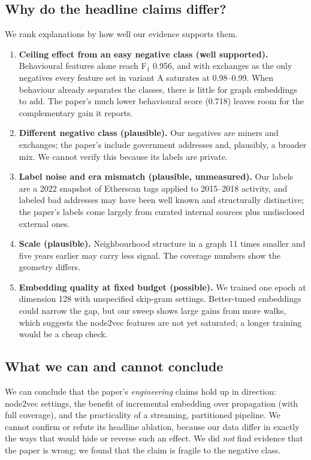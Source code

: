 \subsection{Why do the headline claims differ?}
We rank explanations by how well our evidence supports them.
\begin{enumerate}
\item \textbf{Ceiling effect from an easy negative class (well supported).} Behavioural features alone reach F$_1$ 0.956, and with exchanges as the only negatives every feature set in variant A saturates at 0.98--0.99. When behaviour already separates the classes, there is little for graph embeddings to add. The paper's much lower behavioural score (0.718) leaves room for the complementary gain it reports.
\item \textbf{Different negative class (plausible).} Our negatives are miners and exchanges; the paper's include government addresses and, plausibly, a broader mix. We cannot verify this because its labels are private.
\item \textbf{Label noise and era mismatch (plausible, unmeasured).} Our labels are a 2022 snapshot of Etherscan tags applied to 2015--2018 activity, and labeled bad addresses may have been well known and structurally distinctive; the paper's labels come largely from curated internal sources plus undisclosed external ones.
\item \textbf{Scale (plausible).} Neighbourhood structure in a graph 11 times smaller and five years earlier may carry less signal. The coverage numbers show the geometry differs.
\item \textbf{Embedding quality at fixed budget (possible).} We trained one epoch at dimension 128 with unspecified skip-gram settings. Better-tuned embeddings could narrow the gap, but our sweep shows large gains from more walks, which suggests the node2vec features are not yet saturated; a longer training would be a cheap check.
\end{enumerate}

\subsection{What we can and cannot conclude}
We can conclude that the paper's \emph{engineering} claims hold up in direction: node2vec settings, the benefit of incremental embedding over propagation (with full coverage), and the practicality of a streaming, partitioned pipeline. We cannot confirm or refute its headline ablation, because our data differ in exactly the ways that would hide or reverse such an effect. We did \emph{not} find evidence that the paper is wrong; we found that the claim is fragile to the negative class.

